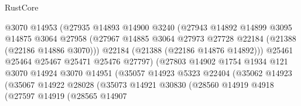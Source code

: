 \begin{lexlean}{RustCore}
\begin{coremodule}
                                  @3070
                                  @14953
                                  (@27935
                                    @14893
                                    @14900
                                    @3240
                                    (@27943
                                      @14892
                                      @14899
                                      @3095
                                      @14875
                                      @3064
                                      @27958
                                      (@27967
                                        @14885
                                        @3064
                                        @27973
                                        @27728
                                        @22184
                                        (@21388 (@22186 @14886 @3070)))
                                      @22184
                                      (@21388 (@22186 @14876 @14892)))
                                    @25461
                                    @25464
                                    @25467
                                    @25471
                                    @25476
                                    @27797)
                                  (@27803
                                    @14902
                                    @1754
                                    @1934
                                    @121
                                    @3070
                                    @14924
                                    @3070
                                    @14951
                                    (@35057
                                      @14923
                                      @5323
                                      @22404
                                      (@35062
                                        @14923
                                        (@35067
                                          @14922
                                          @28028
                                          (@35073
                                            @14921
                                            @30830
                                            (@28560
                                              @14919
                                              @4918
                                              (@27597
                                                @14919
                                                (@28565
                                                  @14907

\end{coremodule}
\end{lexlean}

